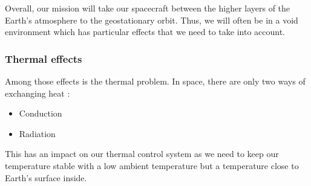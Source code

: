 



Overall, our mission will take our spacecraft between the higher layers of the Earth's atmosphere to the geostationary orbit. Thus, we will often be in a void environment which has particular effects that we need to take into account.
\subsubsection{Thermal effects}
Among those effects is the thermal problem. In space, there are only two ways of exchanging heat :
\begin{itemize}
	\item Conduction
	\item Radiation 
\end{itemize}
This has an impact on our thermal control system as we need to keep our temperature stable with a low ambient temperature but a temperature close to Earth's surface inside.
